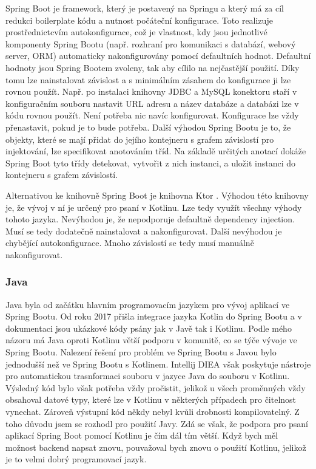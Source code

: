 Spring Boot je framework, který je postavený na Springu a který má za cíl redukci boilerplate kódu a nutnost počáteční konfigurace. Toto realizuje prostřednictcvím \linebreak autokonfigurace, což je vlastnost, kdy jsou jednotlivé komponenty Spring Bootu (např. rozhraní pro komunikaci s databází, webový server, ORM) automaticky nakonfigurovány pomocí defaultních hodnot. Defaultní hodnoty jsou Spring Bootem zvoleny, tak aby cílilo na nejčastější použití. Díky tomu lze nainstalovat závislost a s minimálním zásahem do konfigurace ji lze rovnou použít. Např. po instalaci knihovny JDBC a MySQL konektoru staří v konfiguračním souboru nastavit URL adresu a název databáze a databázi lze v kódu rovnou použít. Není potřeba nic navíc konfigurovat. Konfigurace lze vždy přenastavit, pokud je to bude potřeba. Další výhodou Spring Bootu je to, že objekty, které se mají přidat do jejího kontejneru s grafem závislostí pro injektování, lze specifikovat anotováním tříd. Na základě určitých anotací dokáže Spring Boot tyto třídy detekovat, vytvořit z nich instanci, a uložit instanci do kontejneru s grafem závislostí.

Alternativou ke knihovně Spring Boot je knihovna Ktor \cite{ktor}. Výhodou této knihovny je, že vývoj v ní je určený pro psaní v Kotlinu. Lze tedy využít všechny výhody tohoto jazyka. Nevýhodou je, že nepodporuje defaultně dependency injection. Musí se tedy dodatečně nainstalovat a nakonfigurovat. Další nevýhodou je chybějící autokonfigurace. Mnoho závislostí se tedy musí manuálně nakonfigurovat.

\subsubsection*{Java}
Java byla od začátku hlavním programovacím jazykem pro vývoj aplikací ve Spring Bootu. Od roku 2017 přišla integrace jazyka Kotlin do Spring Bootu \cite{kotlin-support} a v dokumentaci jsou ukázkové kódy psány jak v Javě tak i Kotlinu. Podle mého názoru má Java oproti Kotlinu větší podporu v komunitě, co se týče vývoje ve Spring Bootu. Nalezení řešení pro problém ve Spring Bootu \linebreak s Javou bylo jednodušší než ve Spring Bootu s Kotlinem. Intellij DIEA však poskytuje nástroje pro automatickou trasnformaci souboru v jazyce Java do souboru v Kotlinu. Výsledný kód bylo však potřeba vždy pročistit, jelikož u všech proměnných vždy obsahoval datové typy, které lze \linebreak v Kotlinu v některých případech pro čitelnost vynechat. Zároveň výstupní kód někdy nebyl kvůli drobnosti kompilovatelný. Z toho důvodu jsem se rozhodl pro použití Javy. Zdá se však, že podpora pro psaní aplikací Spring Boot pomocí Kotlinu je čím dál tím větší. Když bych měl možnost backend napsat znovu, pouvažoval bych znovu o použití Kotlinu, jelikož je to velmi dobrý programovací jazyk.

